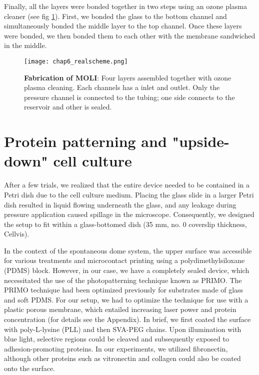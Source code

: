 Finally, all the layers were bonded together in two steps using an ozone plasma cleaner (see fig \ref{fig_6_2}). First, we bonded the glass to the bottom channel and simultaneously bonded the middle layer to the top channel. Once these layers were bonded, we then bonded them to each other with the membrane sandwiched in the middle.

\begin{figure}
	\centering
	\texttt{[image: chap6\_realscheme.png]}
	\caption{ \textbf{Fabrication of MOLI}: Four layers assembled together with ozone plasma cleaning. Each channels has a inlet and outlet. Only the pressure channel is connected to the tubing; one side connects to the reservoir and other is sealed. 
	}\label{fig_6_2}
\end{figure}

\hypertarget{protein-patterning-and-inverted-cell-culture}{%
\section{Protein patterning and "upside-down" cell
culture}\label{protein-patterning-and-inverted-cell-culture}}

After a few trials, we realized that the entire device needed to be contained in a Petri dish due to the cell culture medium. Placing the glass slide in a larger Petri dish resulted in liquid flowing underneath the glass, and any leakage during pressure application caused spillage in the microscope. Consequently, we designed the setup to fit within a glass-bottomed dish (35 mm, no. 0 coverslip thickness, Cellvis).  

In the context of the spontaneous dome system, the upper surface was accessible for various treatments and microcontact printing using a polydimethylsiloxane (PDMS) block. However, in our case, we have a completely sealed device, which necessitated the use of the photopatterning technique known as PRIMO. The PRIMO technique had been optimized previously for substrates made of glass and soft PDMS. For our setup, we had to optimize the technique for use with a plastic porous membrane, which entailed increasing laser power and protein concentration (for details see the Appendix). In brief, we first coated the surface with poly-L-lysine (PLL) and then SVA-PEG chains. Upon illumination with blue light, selective regions could be cleaved and subsequently exposed to adhesion-promoting proteins. In our experiments, we utilized fibronectin, although other proteins such as vitronectin and collagen could also be coated onto the surface.

